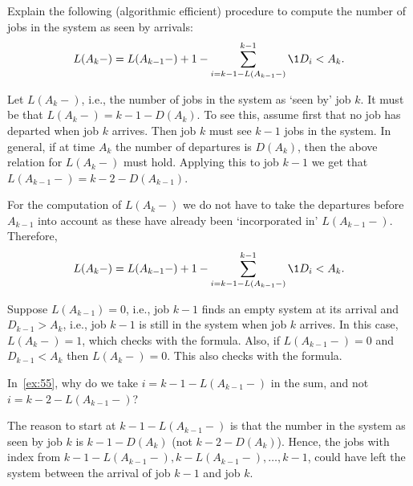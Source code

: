 \begin{exercise}
 Explain the following (algorithmic efficient) procedure to compute the number of jobs in the system as seen by arrivals:
 \begin{equation*}
 L(A_k-) = L(A_{k-1}-)+1 - \sum_{i= k-1 - L(A_{k-1}-)}^{k-1} \1{D_i< A_k}.
 \end{equation*}
\begin{solution}
 Let $ L(A_{k}-)$, i.e., the number of jobs in the system as
 `seen by' job $k$. It must be that $L(A_{k}-)=k-1 - D(A_{k})$. To see
 this, assume first that no job has departed when job $k$
 arrives. Then job $k$ must see $k-1$ jobs in the system. In general,
 if at time $A_k$ the number of departures is $D(A_k)$, then the
 above relation for $L(A_k-)$ must hold. Applying this to job $k-1$ we get that $L(A_{k-1}-) = k-2 - D(A_{k-1})$. 

 For the computation of $L(A_k-)$ we do not have to take the departures
 before $A_{k-1}$ into account as these have already been
 `incorporated in' $L(A_{k-1}-)$. Therefore,
 \begin{equation*}
 L(A_k-) = L(A_{k-1}-) + 1 - \sum_{i= k-1 - L(A_{k-1}-)}^{k-1} \1{D_i< A_k}.
 \end{equation*}

 Suppose $L(A_{k-1})=0$, i.e., job $k-1$ finds an empty system at its
 arrival and $D_{k-1}>A_{k}$, i.e., job $k-1$ is still in the
 system when job $k$ arrives. In this case, $L(A_{k}-)=1$, which checks
 with the formula. Also, if $L(A_{k-1}-)=0$ and $D_{k-1}< A_k$ then
 $L(A_k-) = 0$. This also checks with the formula. 

\end{solution}
\end{exercise}


\begin{extra}
 In~\cref{ex:55}, why do we take $i=k-1-L(A_{k-1}-)$ in the sum, and not $i=k-2-L(A_{k-1}-)$?
\begin{solution}
 The reason to start at $k-1-L(A_{k-1}-)$ is that the number in the
 system as seen by job $k$ is $k-1 - D(A_k)$ (not
 $k-2-D(A_k)$). Hence, the jobs with index from
 $k-1-L(A_{k-1}-), k-L(A_{k-1}-), \ldots, k-1$, could have left the system
 between the arrival of job $k-1$ and job $k$.
\end{solution}
\end{extra}




